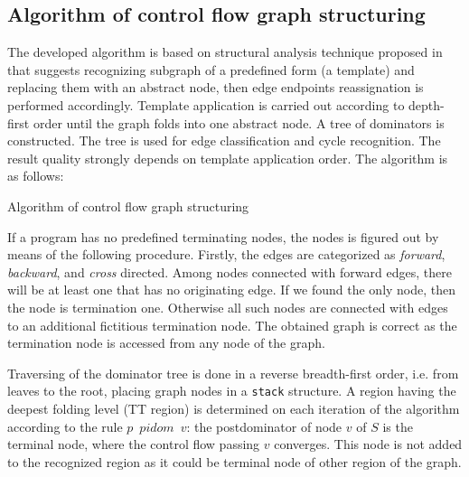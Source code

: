 \documentclass[conference]{IEEEtran}
\begin{document}
\subsection{Algorithm of control flow graph structuring}
\label{sec:algor-contr-flow}

The developed algorithm is based on structural analysis technique proposed in~\cite{17} that suggests recognizing subgraph of a predefined form (a template) and replacing them with an abstract node, then edge endpoints reassignation is performed accordingly.  Template application is carried out according to depth-first order until the graph folds into one abstract node.  A tree of dominators is constructed.  The tree is used for edge classification and cycle recognition.  The result quality strongly depends on template application order.  The algorithm is as follows:

\begin{algorithm}[h]
\caption{Algorithm of control flow graph structuring}
\label{alg:struct}
\SetAlgoLined %
\end{algorithm}


If a program has no predefined terminating nodes, the nodes is figured out by means of the following procedure.  Firstly, the edges are categorized as \emph{forward}, \emph{backward}, and \emph{cross} directed.  Among nodes connected with forward edges, there will be at least one that has no originating edge.  If we found the only node, then the node is termination one.  Otherwise all such nodes are connected with edges to an additional fictitious termination node.  The obtained graph is correct as the termination node is accessed from any node of the graph.

Traversing of the dominator tree is done in a reverse breadth-first order, i.e. from leaves to the root, placing graph nodes in a \texttt{stack} structure.  A region having the deepest folding level (TT region) is determined on each iteration of the algorithm according to the rule $p$~$pidom$~$v$: the postdominator of node $v$ of $S$ is the terminal node, where the control flow passing $v$ converges.  This node is not added to the recognized region as it could be terminal node of other region of the graph.
\end{document}
